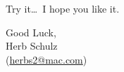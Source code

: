 \documentclass[11pt]{article}
\newcommand{\mnu}[1]{\textsf{#1}}
\newcommand{\cmd}[1]{\textsf{#1}}
\newcommand{\MacTeX}{Mac\kern-.13em\TeX}
\newcommand{\TS}{\textsf{\TeX Shop}}
\newcommand{\latexmk}{\textsf{latexmk}}
\begin{document}
%
%
%
%
%
%

\vspace{5pt plus 2pt minus 1pt}\noindent
Try it\dots\ I hope you like it.

\vspace{5pt plus 2pt minus 1pt}\noindent
Good Luck,\\
Herb Schulz\\
(\href{mailto:herbs2@mac.com}{herbs2@mac.com})
\end{document}
